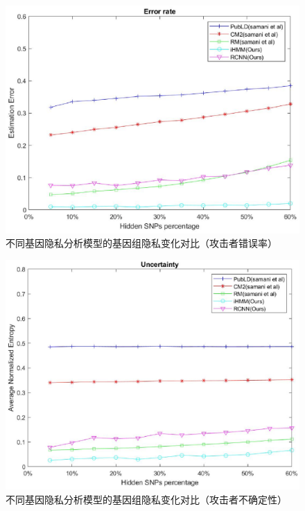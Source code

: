 \begin{figure}[htbp]
	\centering
	\includegraphics[width =0.8\linewidth]{./figures/Fig5-genomic-privacy-quantifying-incorrectness.eps}
	\caption{不同基因隐私分析模型的基因组隐私变化对比（攻击者错误率）}
	\label{fig:error}
\end{figure}
\begin{figure}[htbp]
	\centering
	\includegraphics[width =0.8\linewidth]{./figures/Fig6-genomic-privacy-quantifying-uncertainty.eps}
	\caption{不同基因隐私分析模型的基因组隐私变化对比（攻击者不确定性）}
	\label{fig:uncertainty}
\end{figure}
